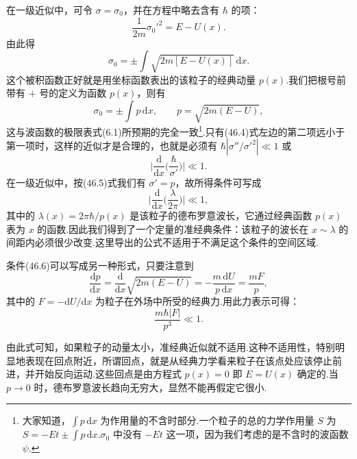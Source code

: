 在一级近似中，可令 $\sigma=\sigma_0$，并在方程中略去含有 $\hbar$ 的项：
\begin{equation*}
  \frac{1}{2m}{\sigma_0'}^2=E-U(x).
\end{equation*}
由此得
\begin{equation*}
  \sigma_0=\pm\int\sqrt{2m[E-U(x)]}\,\mathrm{d}x.
\end{equation*}
这个被积函数正好就是用坐标函数表出的该粒子的经典动量 $p(x)$.我们把根号前带有 $+$ 号的定义为函数 $p(x)$，则有
\begin{equation}
  \sigma_0=\pm\int p\,\mathrm{d}x,\qquad
  p=\sqrt{2m(E-U)},
\end{equation}
这与波函数的极限表式(6.1)所预期的完全一致\footnote{大家知道，$\int p\,\mathrm{d}x$ 为作用量的不含时部分.一个粒子的总的力学作用量 $S$ 为 $S=-Et\pm\int p\,\mathrm{d}x$.$\sigma_0$ 中没有 $-Et$ 这一项，因为我们考虑的是不含时的波函数 $\psi$.}.只有(46.4)式左边的第二项远小于第一项时，这样的近似才是合理的，也就是必须有 $\hbar|\sigma''/{\sigma'}^2|\ll1$ 或
\begin{equation*}
  \bigg|\frac{\mathrm{d}}{\mathrm{d}x}\bigg(\frac{\hbar}{\sigma'}\bigg)\bigg|\ll1.
\end{equation*}
在一级近似中，按(46.5)式我们有 $\sigma'=p$，故所得条件可写成
\begin{equation}
  \bigg|\frac{\mathrm{d}}{\mathrm{d}x}\bigg(\frac{\lambda}{2\pi}\bigg)\bigg|\ll1,
\end{equation}
其中的 $\lambda(x)=2\pi\hbar/p(x)$ 是该粒子的德布罗意波长，它通过经典函数 $p(x)$ 表为 $x$ 的函数.因此我们得到了一个定量的准经典条件：该粒子的波长在 $x\sim\lambda$ 的间距内必须很少改变.这里导出的公式不适用于不满足这个条件的空间区域.

条件(46.6)可以写成另一种形式，只要注意到
\begin{equation*}
  \frac{\mathrm{d}p}{\mathrm{d}x}
  =\frac{\mathrm{d}}{\mathrm{d}x}\sqrt{2m(E-U)}
  =-\frac{m\,\mathrm{d}U}{p\,\mathrm{d}x}
  =\frac{mF}{p},
\end{equation*}
其中的 $F=-\mathrm{d}U/\mathrm{d}x$ 为粒子在外场中所受的经典力.用此力表示可得：
\begin{equation}
  \frac{m\hbar|F|}{p^3}\ll1.
\end{equation}

由此式可知，如果粒子的动量太小，准经典近似就不适用.这种不适用性，特别明显地表现在回点附近，所谓回点，就是从经典力学看来粒子在该点处应该停止前进，并开始反向运动.这些回点是由方程式 $p(x)=0$ 即 $E=U(x)$ 确定的.当 $p\to0$ 时，德布罗意波长趋向无穷大，显然不能再假定它很小.

